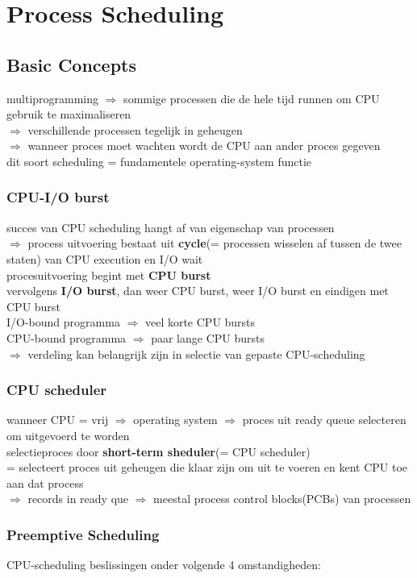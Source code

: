 \documentclass{report}
\begin{document}
\chapter{Process Scheduling}
\section{Basic Concepts}
multiprogramming $\Rightarrow$ sommige processen die de hele tijd runnen om CPU gebruik te maximaliseren
\\$\Rightarrow$ verschillende processen tegelijk in geheugen
\\$\Rightarrow$ wanneer proces moet wachten wordt de CPU aan ander proces gegeven
\\dit soort scheduling = fundamentele operating-system functie
\subsection{CPU-I/O burst}
succes van CPU scheduling hangt af van eigenschap van processen
\\$\Rightarrow$ process uitvoering bestaat uit \textbf{cycle}(= processen wisselen af tussen de twee staten) van CPU execution en I/O wait
\\procesuitvoering begint met \textbf{CPU burst}
\\vervolgens \textbf{I/O burst}, dan weer CPU burst, weer I/O burst en eindigen met CPU burst
\\I/O-bound programma $\Rightarrow$ veel korte CPU bursts
\\CPU-bound programma $\Rightarrow$ paar lange CPU bursts
\\$\Rightarrow$ verdeling kan belangrijk zijn in selectie van gepaste CPU-scheduling

\subsection{CPU scheduler}
wanneer CPU = vrij $\Rightarrow$ operating system $\Rightarrow$ proces uit ready queue selecteren om uitgevoerd te worden
\\selectieproces door \textbf{short-term sheduler}(= CPU scheduler)
\\= selecteert proces uit geheugen die klaar zijn om uit te voeren en kent CPU toe aan dat process
\\$\Rightarrow$ records in ready que $\Rightarrow$ meestal process control blocks(PCBs) van processen

\subsection{Preemptive Scheduling}
CPU-scheduling beslissingen onder volgende 4 omstandigheden:
\end{document}
